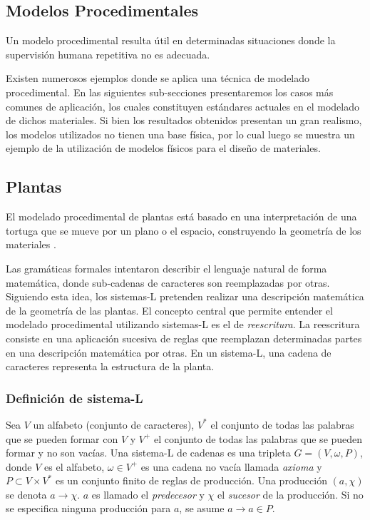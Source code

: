 \subsection{Modelos Procedimentales}
Un modelo procedimental resulta útil en determinadas situaciones donde la supervisión humana repetitiva no es adecuada.

Existen numerosos ejemplos donde se aplica una técnica de modelado procedimental.
En las siguientes sub-secciones presentaremos los casos más comunes de aplicación, los cuales constituyen estándares actuales en el modelado de dichos materiales.
Si bien los resultados obtenidos presentan un gran realismo, los modelos utilizados no tienen una base física, por lo cual luego se muestra un ejemplo de la utilización de modelos físicos para el diseño de materiales.


\subsection{Plantas}
El modelado procedimental de plantas está basado en una interpretación de una tortuga que se mueve por un plano o el espacio, construyendo la geometría de los materiales \cite{Prusinkiewicz1986}.

Las gramáticas formales \cite{Chomsky1956} intentaron describir el lenguaje natural de forma matemática, donde sub-cadenas de caracteres son reemplazadas por otras.
Siguiendo esta idea, los sistemas-L \cite{Lindenmayer1968} pretenden realizar una descripción matemática de la geometría de las plantas.
El concepto central que permite entender el modelado procedimental utilizando sistemas-L es el de {\em reescritura}.
La reescritura consiste en una aplicación sucesiva de reglas que reemplazan determinadas partes en una descripción matemática por otras.
En un sistema-L, una cadena de caracteres representa la estructura de la planta.

\subsubsection{Definición de sistema-L}
Sea $V$ un alfabeto (conjunto de caracteres), $V^{*}$ el conjunto de todas las palabras que se pueden formar con $V$ y $V^{+}$ el conjunto de todas las palabras que se pueden formar y no son vacías.
Una sistema-L de cadenas es una tripleta $G = (V,\omega,P)$, donde $V$ es el alfabeto, $\omega \in V^{+}$ es una cadena no vacía llamada {\em axioma} y $P \subset V \times V^{*}$ es un conjunto finito de reglas de producción.
Una producción $(a,\chi)$ se denota $a \rightarrow \chi$.
$a$ es llamado el {\em predecesor} y $\chi$ el {\em sucesor} de la producción.
Si no se especifica ninguna producción para $a$, se asume $a \rightarrow a \in P$.

